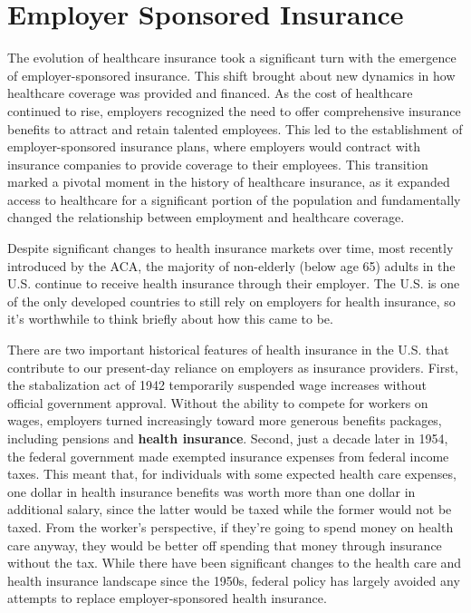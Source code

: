 \documentclass[
  letterpaper,
  DIV=11,
  numbers=noendperiod]{scrreport}
\theoremstyle{definition}
\theoremstyle{remark}
\begin{document}
\hypertarget{sec-esi}{%
\section{Employer Sponsored Insurance}\label{sec-esi}}

The evolution of healthcare insurance took a significant turn with the
emergence of employer-sponsored insurance. This shift brought about new
dynamics in how healthcare coverage was provided and financed. As the
cost of healthcare continued to rise, employers recognized the need to
offer comprehensive insurance benefits to attract and retain talented
employees. This led to the establishment of employer-sponsored insurance
plans, where employers would contract with insurance companies to
provide coverage to their employees. This transition marked a pivotal
moment in the history of healthcare insurance, as it expanded access to
healthcare for a significant portion of the population and fundamentally
changed the relationship between employment and healthcare coverage.

Despite significant changes to health insurance markets over time, most
recently introduced by the ACA, the majority of non-elderly (below age
65) adults in the U.S. continue to receive health insurance through
their employer. The U.S. is one of the only developed countries to still
rely on employers for health insurance, so it's worthwhile to think
briefly about how this came to be.

There are two important historical features of health insurance in the
U.S. that contribute to our present-day reliance on employers as
insurance providers. First, the stabalization act of 1942 temporarily
suspended wage increases without official government approval. Without
the ability to compete for workers on wages, employers turned
increasingly toward more generous benefits packages, including pensions
and \textbf{health insurance}. Second, just a decade later in 1954, the
federal government made exempted insurance expenses from federal income
taxes. This meant that, for individuals with some expected health care
expenses, one dollar in health insurance benefits was worth more than
one dollar in additional salary, since the latter would be taxed while
the former would not be taxed. From the worker's perspective, if they're
going to spend money on health care anyway, they would be better off
spending that money through insurance without the tax. While there have
been significant changes to the health care and health insurance
landscape since the 1950s, federal policy has largely avoided any
attempts to replace employer-sponsored health insurance.
\end{document}
